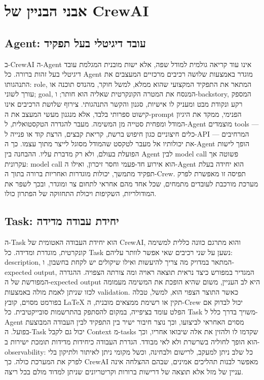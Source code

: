 \chapter{אבני הבניין של CrewAI}
\section{Agent: עובד דיגיטלי בעל תפקיד}
ב-CrewAI ה-Agent אינו עוד קריאה גולמית למודל שפה, אלא ישות מובנית המגלמת עובד דיגיטלי בעל זהות ברורה. כל Agent מוגדר באמצעות שלושה רכיבים מרכזיים המעצבים את התנהגותו: role, המתאר את התפקיד המקצועי שהוא ממלא, למשל חוקר, מהנדס תוכנה או עורך לשוני; goal, המנסח את המטרה הקונקרטית שאליה הוא חותר; ו-backstory, המספק רקע ונקודת מבט ומעניק לו אישיות, סגנון והקשר התנהגותי. צירוף שלושת הרכיבים אינו קישוט ספרותי בלבד, אלא מנגנון מעשי המעצב את ה-prompt הפנימי, ממקד את היגיון המודל ומפחית סטייה מן המשימה. מעבר להגדרה הטקסטואלית, ל-Agent מוצמדים tools — כלים חיצוניים כגון חיפוש ברשת, קריאת קבצים, הרצת קוד או פנייה ל-API — המרחיבים את יכולותיו אל מעבר לטקסט שהמודל מסוגל לייצר מתוך עצמו. כך ה-Agent הופך לישות הפועלת בעולם, ולא רק מדברת עליו. ההבחנה בין Agent לבין model call פשוטה אך עקרונית: model call הוא אירוע חד-פעמי וחסר זיכרון, ואילו ה-Agent הוא יחידה בעלת תפקיד מתמשך, יכולות מוגדרות ואחריות ברורה בתוך ה-Crew. תפיסה זו מאפשרת לפרק מערכת מורכבת לעובדים מתמחים, שכל אחד מהם אחראי לתחום צר ומוגדר, ובכך לשפר את המודולריות, השקיפות ויכולת התחזוקה של הפתרון כולו.

\section{Task: יחידת עבודה מדידה}
ה-Task הוא יחידת העבודה האטומית של CrewAI, והוא מתרגם כוונה כללית למשימה קונקרטית, מוגדרת ומדידה. כל Task נשען על שני רכיבים שאי אפשר לוותר עליהם: description, המתאר במדויק מה צריך להיעשות ואילו שיקולים יש לקחת בחשבון, ו-expected output, המגדיר במפורש כיצד נראית תוצאה ראויה ומה צורתה הצפויה. ההגדרה המפורשת של ה-expected output היא לב העניין, משום שהיא הופכת את המשימה מעמומה לכזו שניתן לאמת מולה באמצעות validation. כאשר התוצר הצפוי הוא, למשל, טבלה בפורמט מסוים, קובץ LaTeX תקין או רשימת ממצאים מובנית, ה-Crew יכול לבדוק אם הפלט עומד בציפייה, במקום להסתפק בהתרשמות סובייקטיבית. כל Task משויך בדרך כלל ל-Agent מסוים האחראי לביצועו, וכך נוצר חיבור ישיר בין התפקיד לבין העבודה המבוצעת בפועל. ה-Task יכול גם לקבל Context מ-tasks שקדמו לו ולהזין את אלה שיבואו אחריו, וכך הוא הופך לחוליה בשרשרת ולא לאי מבודד. הגדרת העבודה כיחידות מדידות תומכת ישירות ב-observability: כל שלב ניתן למעקב, לרישום ולבחינה, וכשל מקומי ניתן לאיתור ולתיקון בלי לפרק את המערכת כולה. כך CrewAI מאפשר לבנות תהליכים אמינים, שבהם ההצלחה אינה עניין של מזל אלא תוצאה של דרישות ברורות וקריטריונים שניתן למדוד מולם בכל ריצה.

